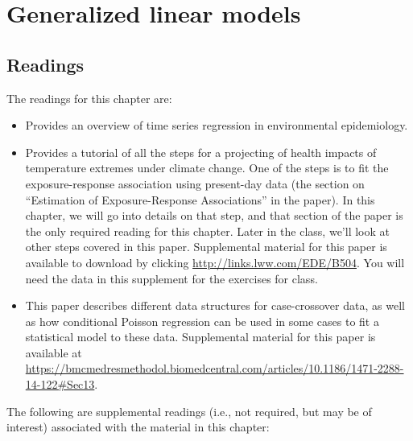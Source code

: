 \documentclass[
]{book}
\providecommand{\tightlist}{%
  \setlength{\itemsep}{0pt}\setlength{\parskip}{0pt}}
\begin{document}
\hypertarget{generalized-linear-models}{%
\chapter{Generalized linear models}\label{generalized-linear-models}}

\hypertarget{readings-1}{%
\section{Readings}\label{readings-1}}

The readings for this chapter are:

\begin{itemize}
\tightlist
\item
  \citet{bhaskaran2013time} Provides an overview of time series regression
  in environmental epidemiology.
\item
  \citet{vicedo2019hands} Provides a tutorial of all the steps for a
  projecting of health impacts of temperature extremes under climate change.
  One of the steps is to fit the exposure-response association using present-day data
  (the section on ``Estimation of Exposure-Response Associations'' in the paper).
  In this chapter, we will go into details on that step, and that section of the paper
  is the only required reading for this chapter. Later in the class, we'll
  look at other steps covered in this paper. Supplemental material for this paper is
  available to download by
  clicking \url{http://links.lww.com/EDE/B504}. You will need the data in this supplement
  for the exercises for class.
\item
  \citet{armstrong2014conditional} This paper describes different data structures for
  case-crossover data, as well as how conditional Poisson regression can be used
  in some cases to fit a statistical model to these data.
  Supplemental material for this paper is available at
  \url{https://bmcmedresmethodol.biomedcentral.com/articles/10.1186/1471-2288-14-122\#Sec13}.
\end{itemize}

The following are supplemental readings (i.e., not required, but may be of
interest) associated with the material in this chapter:
\end{document}
